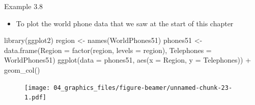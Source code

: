 \documentclass[
  9pt,
  a4paper,
  ignorenonframetext,
  notheorems]{beamer}
\newenvironment{Shaded}{\begin{snugshade}}{\end{snugshade}}
\newcommand{\AttributeTok}[1]{\textcolor[rgb]{0.40,0.45,0.13}{#1}}
\newcommand{\FunctionTok}[1]{\textcolor[rgb]{0.28,0.35,0.67}{#1}}
\newcommand{\NormalTok}[1]{\textcolor[rgb]{0.00,0.23,0.31}{#1}}
\newcommand{\OtherTok}[1]{\textcolor[rgb]{0.00,0.23,0.31}{#1}}
\newcommand{\SpecialCharTok}[1]{\textcolor[rgb]{0.37,0.37,0.37}{#1}}
\providecommand{\tightlist}{%
  \setlength{\itemsep}{0pt}\setlength{\parskip}{0pt}}\usepackage{longtable,booktabs,array}
\begin{document}
\begin{frame}[fragile]
\begin{block}{Example 3.8}
\protect\hypertarget{example-3.8}{}
\begin{itemize}
\tightlist
\item
  To plot the world phone data that we saw at the start of this chapter
\end{itemize}

\begin{Shaded}
\begin{Highlighting}[]
\FunctionTok{library}\NormalTok{(ggplot2)}
\NormalTok{region }\OtherTok{\textless{}{-}} \FunctionTok{names}\NormalTok{(WorldPhones51)}
\NormalTok{phones51 }\OtherTok{\textless{}{-}} \FunctionTok{data.frame}\NormalTok{(}\AttributeTok{Region =} \FunctionTok{factor}\NormalTok{(region, }\AttributeTok{levels =}\NormalTok{ region), }\AttributeTok{Telephones =}\NormalTok{ WorldPhones51)}
\FunctionTok{ggplot}\NormalTok{(}\AttributeTok{data =}\NormalTok{ phones51, }\FunctionTok{aes}\NormalTok{(}\AttributeTok{x =}\NormalTok{ Region, }\AttributeTok{y =}\NormalTok{ Telephones)) }\SpecialCharTok{+} \FunctionTok{geom\_col}\NormalTok{()}
\end{Highlighting}
\end{Shaded}

\begin{figure}

{\centering \texttt{[image: 04\_graphics\_files/figure-beamer/unnamed-chunk-23-1.pdf]}

}

\end{figure}
\end{block}
\end{frame}
\end{document}
